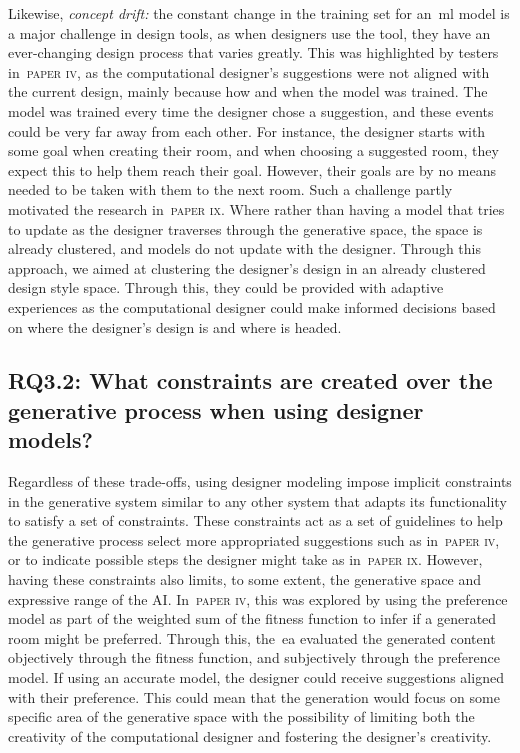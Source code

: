 Likewise, \emph{concept drift:} the constant change in the training set for an~\acrshort{ml} model is a major challenge in design tools, as when designers use the tool, they have an ever-changing design process that varies greatly. This was highlighted by testers in~\textsc{paper iv}, as the computational designer's suggestions were not aligned with the current design, mainly because how and when the model was trained. The model was trained every time the designer chose a suggestion, and these events could be very far away from each other. For instance, the designer starts with some goal when creating their room, and when choosing a suggested room, they expect this to help them reach their goal. However, their goals are by no means needed to be taken with them to the next room. Such a challenge partly motivated the research in~\textsc{paper ix}. Where rather than having a model that tries to update as the designer traverses through the generative space, the space is already clustered, and models do not update with the designer. Through this approach, we aimed at clustering the designer's design in an already clustered design style space. Through this, they could be provided with adaptive experiences as the computational designer could make informed decisions based on where the designer's design is and where is headed. 

\subsection[Research Question 3.2]{RQ3.2: What constraints are created over the generative process when using designer models?}

Regardless of these trade-offs, using designer modeling impose implicit constraints in the generative system similar to any other system that adapts its functionality to satisfy a set of constraints. These constraints act as a set of guidelines to help the generative process select more appropriated suggestions such as in~\textsc{paper iv}, or to indicate possible steps the designer might take as in~\textsc{paper ix}. However, having these constraints also limits, to some extent, the generative space and expressive range of the AI. In~\textsc{paper iv}, this was explored by using the preference model as part of the weighted sum of the fitness function to infer if a generated room might be preferred. Through this, the~\acrshort{ea} evaluated the generated content objectively through the fitness function, and subjectively through the preference model. If using an accurate model, the designer could receive suggestions aligned with their preference. This could mean that the generation would focus on some specific area of the generative space with the possibility of limiting both the creativity of the computational designer and fostering the designer's creativity.

